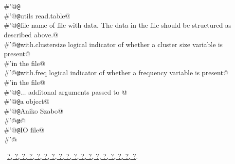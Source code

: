 \documentclass[reqno]{amsart}
\renewcommand{\NWlink}[2]{\hyperlink{#1}{#2}}
\begin{document}
\begin{flushleft}
\begin{minipage}{\linewidth}
\begin{list}{}{}
\mbox{}\verb@#'@{\tt @}\verb@export@\\
\mbox{}\verb@#'@{\tt @}\verb@importFrom utils read.table@\\
\mbox{}\verb@#'@{\tt @}\verb@param file name of file with data. The data in the file should be structured as described above.@\\
\mbox{}\verb@#'@{\tt @}\verb@param with.clustersize logical indicator of whether a cluster size variable is present@\\
\mbox{}\verb@#'in the file@\\
\mbox{}\verb@#'@{\tt @}\verb@param with.freq logical indicator of whether a frequency variable is present@\\
\mbox{}\verb@#'in the file@\\
\mbox{}\verb@#'@{\tt @}\verb@param ... additonal arguments passed to @\\
\mbox{}\verb@#'@{\tt @}\verb@return a  object@\\
\mbox{}\verb@#'@{\tt @}\verb@author Aniko Szabo@\\
\mbox{}\verb@#'@{\tt @}\verb@seealso {}@\\
\mbox{}\verb@#'@{\tt @}\verb@keywords IO file@\\
\mbox{}\verb@#'@\\
\mbox{}\verb@@{\NWsep}
\end{list}
\vspace{-1.5ex}
\footnotesize
\begin{list}{}{\setlength{\itemsep}{-\parsep}\setlength{\itemindent}{-\leftmargin}}
\item \NWtxtFileDefBy\ \NWlink{nuweb?}{?}\NWlink{nuweb?}{, ?}\NWlink{nuweb?}{, ?}\NWlink{nuweb?}{, ?}\NWlink{nuweb?}{, ?}\NWlink{nuweb?}{, ?}\NWlink{nuweb?}{, ?}\NWlink{nuweb?}{, ?}\NWlink{nuweb?}{, ?}\NWlink{nuweb?}{, ?}\NWlink{nuweb?}{, ?}\NWlink{nuweb?}{, ?}\NWlink{nuweb?}{, ?}\NWlink{nuweb?}{, ?}\NWlink{nuweb?}{, ?}\NWlink{nuweb?}{, ?}\NWlink{nuweb?}{, ?}\NWlink{nuweb?}{, ?}.

\item{}
\end{list}
\end{minipage}\vspace{4ex}
\end{flushleft}
\end{document}

